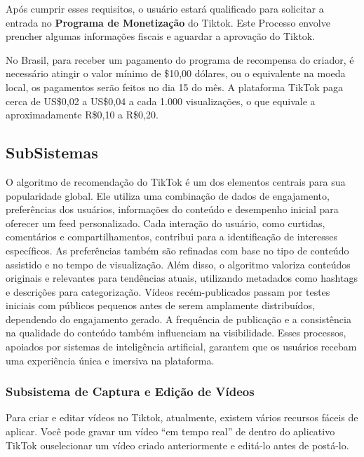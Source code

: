 Após cumprir esses requisitos, o usuário estará qualificado para solicitar a entrada no \textbf{Programa de Monetização} do Tiktok. Este Processo envolve prencher algumas informações fiscais e aguardar a aprovação do Tiktok.\vskip0.3cm

No Brasil, para receber um pagamento do programa de recompensa do criador, é necessário atingir o valor mínimo de \$10,00 dólares, ou o equivalente na moeda local, os pagamentos serão feitos no dia 15 do mês. A plataforma TikTok paga cerca de US\$0,02 a US\$0,04 a cada 1.000 visualizações, o que equivale a aproximadamente R\$0,10 a R\$0,20.











\newpage
\subsection{SubSistemas}

O algoritmo de recomendação do TikTok é um dos elementos centrais para sua popularidade global. Ele utiliza uma combinação de dados de engajamento, preferências dos usuários, informações do conteúdo e desempenho inicial para oferecer um feed personalizado. Cada interação do usuário, como curtidas, comentários e compartilhamentos, contribui para a identificação de interesses específicos. As preferências também são refinadas com base no tipo de conteúdo assistido e no tempo de visualização. Além disso, o algoritmo valoriza conteúdos originais e relevantes para tendências atuais, utilizando metadados como hashtags e descrições para categorização. Vídeos recém-publicados passam por testes iniciais com públicos pequenos antes de serem amplamente distribuídos, dependendo do engajamento gerado. A frequência de publicação e a consistência na qualidade do conteúdo também influenciam na visibilidade. Esses processos, apoiados por sistemas de inteligência artificial, garantem que os usuários recebam uma experiência única e imersiva na plataforma.


\newpage

\subsubsection{Subsistema de Captura e Edição de Vídeos}

Para criar e editar vídeos no Tiktok, atualmente, existem vários recursos fáceis de aplicar. Você pode gravar um vídeo “em tempo real” de dentro do aplicativo TikTok ouselecionar um vídeo criado anteriormente e editá-lo antes de postá-lo. \vskip0.3cm

